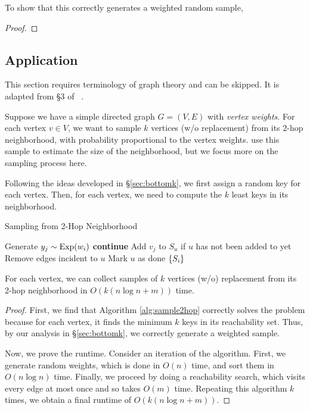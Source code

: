 \documentclass{article}
\begin{document}
To show that this correctly generates a weighted random sample,
\begin{proof}

\end{proof}

\subsection{Application}
\label{sec:reach}

This section requires terminology of graph theory and can be skipped.
It is adapted from \S3 of ~\cite{cohen97-12}.

Suppose we have a simple directed graph $G = (V, E)$ with \emph{vertex weights}.
For each vertex $v \in V$, we want to sample $k$ vertices (w/o replacement) from its $2$-hop neighborhood, with probability proportional to the vertex weights.
\cite{cohen97-12} use this sample to estimate the size of the neighborhood, but we focus more on the sampling process here.

Following the ideas developed in \S\ref{sec:bottomk}, we first assign a random key for each vertex.
Then, for each vertex, we need to compute the $k$ least keys in its neighborhood.

\begin{algorithm}
	\caption{Sampling from 2-Hop Neighborhood}
	\begin{algorithmic}[1]
				\State Generate $y_j \sim \operatorname{Exp}(w_i)$
						\State \textbf{continue}
					\EndIf
						\State Add $v_j$ to $S_u$ if $u$ has not been added to yet
						\State Remove edges incident to $u$
						\State Mark $u$ as done
					\EndFor
				\EndFor
			\EndFor
			\Return $\left\{ S_i \right\}$
		\EndFunction
	\end{algorithmic}
	\label{alg:sample2hop}
\end{algorithm}

\begin{theorem}
	For each vertex, we can collect samples of $k$ vertices (w/o) replacement from its 2-hop neighborhood in $O(k(n \log n + m))$ time.
\end{theorem}

\begin{proof}
	First, we find that Algorithm \ref{alg:sample2hop} correctly solves the problem because for each vertex, it finds the minimum $k$ keys in its reachability set.
	Thus, by our analysis in \S\ref{sec:bottomk}, we correctly generate a weighted sample.

	Now, we prove the runtime.
	Consider an iteration of the algorithm.
	First, we generate random weights, which is done in $O(n)$ time, and sort them in $O(n \log n)$ time.
	Finally, we proceed by doing a reachability search, which visits every edge at most once and so takes $O(m)$ time.
	Repeating this algorithm $k$ times, we obtain a final runtime of $O(k(n \log n + m))$.
\end{proof}
\end{document}

